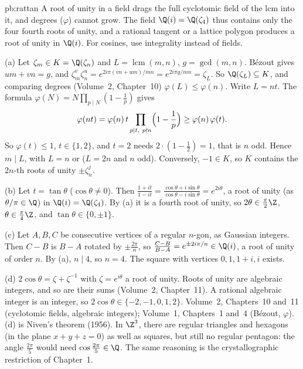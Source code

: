 \begin{solution}{pb:rattan}
\idea A root of unity in a field drags the full cyclotomic field of the lcm into it, and degrees ($\varphi$) cannot grow. The
field $\Q(i)=\Q(\zeta_4)$ thus contains only the four fourth roots of unity, and a rational tangent or a lattice polygon
produces a root of unity in $\Q(i)$. For cosines, use integrality instead of fields.

\writeup (a) Let $\zeta_m\in K=\Q(\zeta_n)$ and $L=\operatorname{lcm}(m,n)$, $g=\gcd(m,n)$. Bézout gives $um+vn=g$, and
$\zeta_m^v\zeta_n^u=e^{2i\pi(vn+um)/mn}=e^{2i\pi g/mn}=\zeta_L$. So $\Q(\zeta_L)\subseteq K$, and comparing degrees (Volume~2,
Chapter~10) $\varphi(L)\le\varphi(n)$. Write $L=nt$. The formula $\varphi(N)=N\prod_{p\mid N}(1-\frac1p)$ gives
\[
\varphi(nt)=\varphi(n)\,t\prod_{p\mid t,\ p\nmid n}\Bigl(1-\frac1p\Bigr)\ge\varphi(n)\,\varphi(t).
\]
So $\varphi(t)\le1$, $t\in\{1,2\}$, and $t=2$ needs $2\cdot(1-\frac12)=1$, that is $n$ odd. Hence $m\mid L$, with $L=n$ or ($L=2n$
and $n$ odd). Conversely, $-1\in K$, so $K$ contains the $2n$-th roots of unity $\pm\zeta_n^j$.

(b) Let $t=\tan\theta$ ($\cos\theta\ne0$). Then $\frac{1+it}{1-it}=\frac{\cos\theta+i\sin\theta}{\cos\theta-i\sin\theta}=e^{2i\theta}$,
a root of unity (as $\theta/\pi\in\Q$) in $\Q(i)=\Q(\zeta_4)$. By (a) it is a fourth root of unity, so
$2\theta\in\frac\pi2\Z$, $\theta\in\frac\pi4\Z$, and $\tan\theta\in\{0,\pm1\}$.

(c) Let $A,B,C$ be consecutive vertices of a regular $n$-gon, as Gaussian integers. Then $C-B$ is $B-A$ rotated by
$\pm\frac{2\pi}n$, so $\frac{C-B}{B-A}=e^{\pm2i\pi/n}\in\Q(i)$, a root of unity of order $n$. By (a), $n\mid4$, so $n=4$. The
square with vertices $0,1,1+i,i$ exists.

(d) $2\cos\theta=\zeta+\zeta^{-1}$ with $\zeta=e^{i\theta}$ a root of unity. Roots of unity are algebraic integers, and so are
their sums (Volume~2, Chapter~11). A rational algebraic integer is an integer, so $2\cos\theta\in\{-2,-1,0,1,2\}$.
\tools Volume~2, Chapters~10 and~11 (cyclotomic fields, algebraic integers); Volume~1, Chapters~1 and~4 (Bézout, $\varphi$).
\leads (d) is Niven's theorem (1956). In $\Z^3$, there are regular triangles and hexagons (in the plane $x+y+z=0$) as well as
squares, but still no regular pentagon: the angle $\frac{2\pi}5$ would need $\cos\frac{2\pi}5\in\Q$. The same reasoning is
the crystallographic restriction of Chapter~1.
\end{solution}

